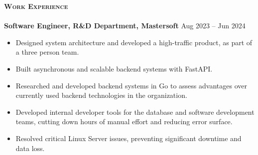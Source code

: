\documentclass[a4paper]{article}
\newcommand{\lineunder} {
\vspace*{-8pt} \\
\hspace*{-18pt} \hrulefill \\
}
\newcommand{\header}[1]{%
{\hspace*{-18pt}\vspace*{6pt} \textsc{\textbf{\Large{#1}}}}%
\vspace*{-6pt} \lineunder
}
\begin{document}
\header{Work Experience}
\vspace{1mm}
\textbf{Software Engineer, R\&D Department, Mastersoft} \hfill Aug 2023 -- Jun 2024 \\
\vspace{-1mm}
\begin{itemize}

    \item Designed system architecture and developed a high-traffic product,
    as part of a three person team. \\
    \item Built asynchronous and scalable backend systems with FastAPI. \\
    \item Researched and developed backend systems in Go to assess advantages
    over currently used backend technologies in the organization. \\
    \item Developed internal developer tools for the database and software development teams,
    cutting down hours of manual effort and reducing error surface. \\
    \item Resolved critical Linux Server issues, 
    preventing significant downtime and data loss. \\

\end{itemize}
\end{document}
